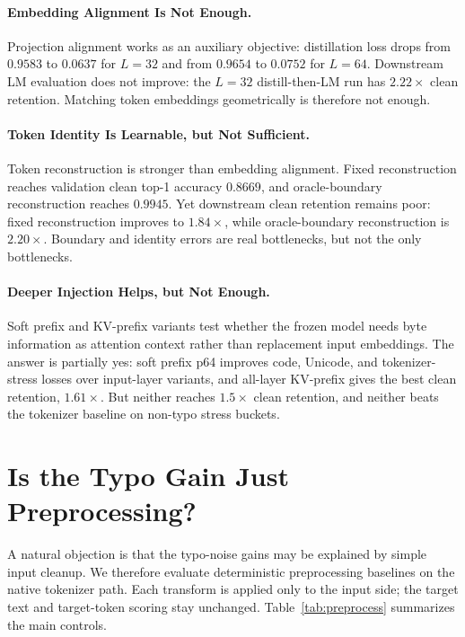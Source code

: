 \documentclass[runningheads]{llncs}
\begin{document}
\paragraph{Embedding Alignment Is Not Enough.}
Projection alignment works as an auxiliary objective: distillation loss drops from $0.9583$ to $0.0637$ for $L=32$ and from $0.9654$ to $0.0752$ for $L=64$. Downstream LM evaluation does not improve: the $L=32$ distill-then-LM run has $2.22\times$ clean retention. Matching token embeddings geometrically is therefore not enough.

\paragraph{Token Identity Is Learnable, but Not Sufficient.}
Token reconstruction is stronger than embedding alignment. Fixed reconstruction reaches validation clean top-1 accuracy $0.8669$, and oracle-boundary reconstruction reaches $0.9945$. Yet downstream clean retention remains poor: fixed reconstruction improves to $1.84\times$, while oracle-boundary reconstruction is $2.20\times$. Boundary and identity errors are real bottlenecks, but not the only bottlenecks.

\paragraph{Deeper Injection Helps, but Not Enough.}
Soft prefix and KV-prefix variants test whether the frozen model needs byte information as attention context rather than replacement input embeddings. The answer is partially yes: soft prefix p64 improves code, Unicode, and tokenizer-stress losses over input-layer variants, and all-layer KV-prefix gives the best clean retention, $1.61\times$. But neither reaches $1.5\times$ clean retention, and neither beats the tokenizer baseline on non-typo stress buckets.

\section{Is the Typo Gain Just Preprocessing?}

A natural objection is that the typo-noise gains may be explained by simple input cleanup. We therefore evaluate deterministic preprocessing baselines on the native tokenizer path. Each transform is applied only to the input side; the target text and target-token scoring stay unchanged. Table~\ref{tab:preprocess} summarizes the main controls.
\end{document}
